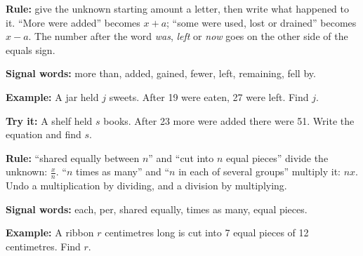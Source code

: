\documentclass[12pt]{article}
\begin{document}


\begin{formulabox}
\textbf{Rule:} give the unknown starting amount a letter, then write what
happened to it. ``More were added'' becomes $x + a$; ``some were used, lost or
drained'' becomes $x - a$. The number after the word \emph{was}, \emph{left} or
\emph{now} goes on the other side of the equals sign.\par
\textbf{Signal words:} more than, added, gained, fewer, left, remaining, fell by.
\end{formulabox}

\begin{examplebox}
\textbf{Example:} \quad A jar held $j$ sweets. After 19 were eaten, 27 were
left. Find $j$.
\end{examplebox}

\begin{tryitbox}
\textbf{Try it:} \quad A shelf held $s$ books. After 23 more were added there
were 51. Write the equation and find $s$.\\[2pt]
\end{tryitbox}


\begin{formulabox}
\textbf{Rule:} ``shared equally between $n$'' and ``cut into $n$ equal pieces''
divide the unknown: $\frac{x}{n}$. ``$n$ times as many'' and ``$n$ in each of
several groups'' multiply it: $nx$. Undo a multiplication by dividing, and a
division by multiplying.\par
\textbf{Signal words:} each, per, shared equally, times as many, equal pieces.
\end{formulabox}

\begin{examplebox}
\textbf{Example:} \quad A ribbon $r$ centimetres long is cut into 7 equal pieces
of 12 centimetres. Find $r$.
\end{examplebox}
\end{document}
